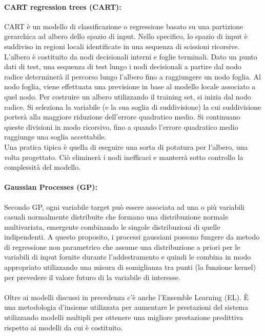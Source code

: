 \documentclass[12pt,a4paper]{report}
\begin{document}
\paragraph*{CART regression trees (CART):}
CART è un modello di classificazione o regressione basato su una partizione gerarchica ad albero dello spazio di input.
Nello specifico, lo spazio di input è suddiviso in regioni locali identificate in una sequenza di scissioni ricorsive. L'albero è costituito da nodi decisionali interni e foglie terminali. Dato un punto dati di test, una sequenza di test lungo i nodi decisionali a partire dal nodo radice determinerà il percorso lungo l'albero fino a raggiungere un nodo foglia. Al nodo foglia, viene effettuata una previsione in base al modello locale associato a quel nodo. Per costruire un albero utilizzando il training set, si inizia dal nodo radice. Si seleziona la variabile (e la sua soglia di suddivisione) la cui suddivisione porterà alla maggiore riduzione dell'errore quadratico medio. Si continuano queste divisioni in modo ricorsivo, fino a quando l'errore quadratico medio raggiunge una soglia accettabile.\\
Una pratica tipica è quella di eseguire una sorta di potatura per l'albero, una volta progettato. Ciò eliminerà i nodi inefficaci e manterrà sotto controllo la complessità del modello. 


\paragraph*{Gaussian Processes (GP):}
Secondo GP, ogni variabile target può essere associata ad una o più variabili casuali normalmente distribuite che formano una distribuzione normale multivariata, emergente combinando le singole distribuzioni di quelle indipendenti. A questo proposito, i processi gaussiani possono fungere da metodo di regressione non parametrico che assume una distribuzione a priori per le variabili di input fornite durante l'addestramento e quindi le combina in modo appropriato utilizzando una misura di somiglianza tra punti (la funzione kernel) per prevedere il valore futuro di la variabile di interesse.\\
\\
Oltre ai modelli discussi in precedenza c'è anche l'Ensemble Learning (EL). È una metodologia d'insieme utilizzata per aumentare le prestazioni del sistema utilizzando modelli multipli per ottenere una migliore prestazione predittiva rispetto ai modelli da cui è costituito.
\end{document}
